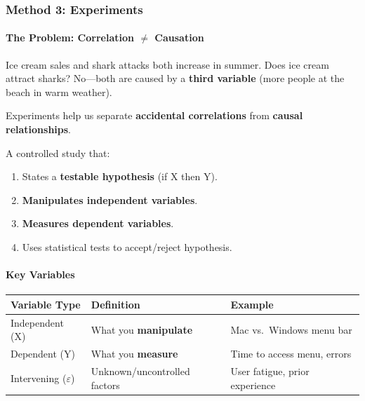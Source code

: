 \subsubsection*{Method 3: Experiments}

\paragraph*{The Problem: Correlation $\neq$ Causation}

\begin{exbox}
Ice cream sales and shark attacks both increase in summer. Does ice cream attract sharks? No---both are caused by a \textbf{third variable} (more people at the beach in warm weather).
\end{exbox}

Experiments help us separate \textbf{accidental correlations} from \textbf{causal relationships}.

\begin{defbox}[Experiment]
A controlled study that:
\begin{enumerate}
  \item States a \textbf{testable hypothesis} (if X then Y).
  \item \textbf{Manipulates independent variables}.
  \item \textbf{Measures dependent variables}.
  \item Uses statistical tests to accept/reject hypothesis.
\end{enumerate}
\end{defbox}

\paragraph*{Key Variables}

\begin{center}
\renewcommand{\arraystretch}{1.3}
\begin{tabular}{@{} l p{7cm} l @{}}
\toprule
\textbf{Variable Type} & \textbf{Definition} & \textbf{Example} \\
\midrule
Independent (X) & What you \textbf{manipulate} & Mac vs.\ Windows menu bar \\
Dependent (Y) & What you \textbf{measure} & Time to access menu, errors \\
Intervening ($\varepsilon$) & Unknown/uncontrolled factors & User fatigue, prior experience \\
\bottomrule
\end{tabular}
\end{center}

